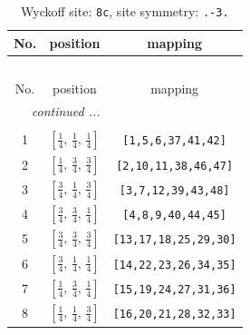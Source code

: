 \documentclass[fleqn,8pt]{jsarticle}
\begin{document}
\renewcommand{\arraystretch}{1.2}
\begin{longtable}{ccc}
\caption{Wyckoff site: {\tt 8c}, site symmetry: {\tt .-3.}}
 \\
 \hline \hline
No. & position & mapping \\ \hline \endfirsthead

\multicolumn{2}{l}{\tablename\ \thetable{}} \\
 \hline \hline
No. & position & mapping \\ \hline \endhead

 \hline \hline
\multicolumn{2}{r}{\footnotesize\it continued ...} \\ \endfoot

 \hline \hline
\multicolumn{2}{r}{} \\ \endlastfoot

1 & $\left[ \frac{1}{4},\, \frac{1}{4},\, \frac{1}{4} \right]$ & {\tt [1,5,6,37,41,42]} \\ \hline
2 & $\left[ \frac{1}{4},\, \frac{3}{4},\, \frac{3}{4} \right]$ & {\tt [2,10,11,38,46,47]} \\ \hline
3 & $\left[ \frac{3}{4},\, \frac{1}{4},\, \frac{3}{4} \right]$ & {\tt [3,7,12,39,43,48]} \\ \hline
4 & $\left[ \frac{3}{4},\, \frac{3}{4},\, \frac{1}{4} \right]$ & {\tt [4,8,9,40,44,45]} \\ \hline
5 & $\left[ \frac{3}{4},\, \frac{3}{4},\, \frac{3}{4} \right]$ & {\tt [13,17,18,25,29,30]} \\ \hline
6 & $\left[ \frac{3}{4},\, \frac{1}{4},\, \frac{1}{4} \right]$ & {\tt [14,22,23,26,34,35]} \\ \hline
7 & $\left[ \frac{1}{4},\, \frac{3}{4},\, \frac{1}{4} \right]$ & {\tt [15,19,24,27,31,36]} \\ \hline
8 & $\left[ \frac{1}{4},\, \frac{1}{4},\, \frac{3}{4} \right]$ & {\tt [16,20,21,28,32,33]} \\
\end{longtable}
\renewcommand{\arraystretch}{1.2}
\end{document}

